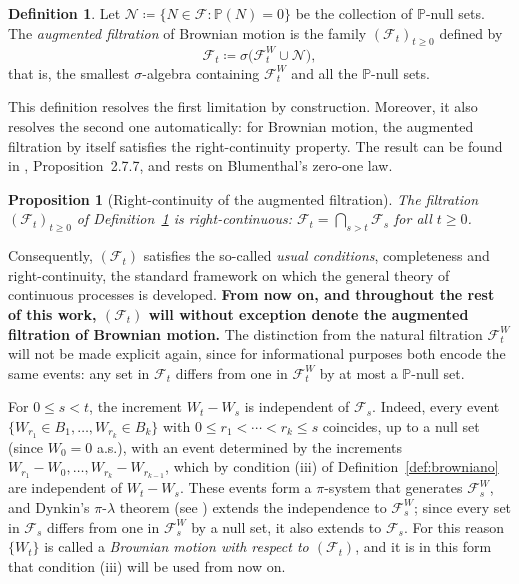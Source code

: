 \documentclass[11pt,a4paper,oneside]{report}
\theoremstyle{plain}
\newtheorem{proposicion}[teorema]{Proposition}
\theoremstyle{definition}
\newtheorem{definicion}[teorema]{Definition}
\theoremstyle{remark}
\newcommand{\PP}{\mathbb{P}}
\newcommand{\F}{\mathcal{F}}
\newcommand{\1}{\mathbf{1}}
\newcommand{\eqdef}{\coloneqq}
\begin{document}
\begin{definicion}
\label{def:filtracion_aumentada}
Let $\mathcal{N} \eqdef \{N \in \F : \PP(N) = 0\}$ be the collection
of $\PP$-null sets. The \emph{augmented filtration} of Brownian motion
is the family $(\F_t)_{t \geq 0}$ defined by
\begin{equation*}
  \F_t \eqdef \sigma\bigl(\F_t^W \cup \mathcal{N}\bigr),
\end{equation*}
that is, the smallest $\sigma$-algebra containing $\F_t^W$ and all
the $\PP$-null sets.
\end{definicion}

This definition resolves the first limitation by construction.
Moreover, it also resolves the second one automatically: for Brownian
motion, the augmented filtration by itself satisfies the
right-continuity property. The result can be found in
\cite{karatzas-shreve}, Proposition~2.7.7, and rests on Blumenthal's
zero-one law.

\begin{proposicion}[Right-continuity of the augmented filtration]
\label{prop:filtracion_continua_derecha}
The filtration $(\F_t)_{t \geq 0}$ of
Definition~\ref{def:filtracion_aumentada} is right-continuous:
$\F_t = \bigcap_{s > t} \F_s$ for all $t \geq 0$.
\end{proposicion}

Consequently, $(\F_t)$ satisfies the so-called \emph{usual
conditions}, completeness and right-continuity, the standard framework
on which the general theory of continuous processes is developed.
\textbf{From now on, and throughout the rest of this work, $(\F_t)$
will without exception denote the augmented filtration of Brownian
motion.} The distinction from the natural filtration $\F_t^W$ will not
be made explicit again, since for informational purposes both encode
the same events: any set in $\F_t$ differs from one in $\F_t^W$ by at
most a $\PP$-null set.

For $0 \leq s < t$, the increment $W_t - W_s$ is independent of $\F_s$. Indeed, every event $\{W_{r_1} \in B_1, \ldots, W_{r_k} \in B_k\}$ with $0 \leq r_1 < \cdots < r_k \leq s$ coincides, up to a null set (since $W_0 = 0$ a.s.), with an event determined by the increments $W_{r_1} - W_0, \ldots, W_{r_k} - W_{r_{k-1}}$, which by condition (iii) of Definition~\ref{def:browniano} are independent of $W_t - W_s$. These events form a $\pi$-system that generates $\F_s^W$, and Dynkin's $\pi$-$\lambda$ theorem (see \cite{williams}) extends the independence to $\F_s^W$; since every set in $\F_s$ differs from one in $\F_s^W$ by a null set, it also extends to $\F_s$. For this reason $\{W_t\}$ is called a \emph{Brownian motion with respect to $(\F_t)$}, and it is in this form that condition (iii) will be used from now on.
\end{document}
